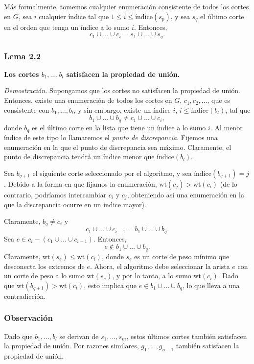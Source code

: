 \documentclass[a4paper, 12pt]{article}
\begin{document}
Más formalmente, tomemos cualquier enumeración consistente de todos los cortes en \( G \), sea \( i \) cualquier índice tal que \( 1 \leq i \leq \text{índice}(s_p) \), y sea \( s_q \) el último corte en el orden que tenga un índice a lo sumo \( i \). Entonces,
\[
c_1 \cup \dots \cup c_i = s_1 \cup \dots \cup s_q.
\]

\subsubsection*{Lema 2.2}
\textbf{Los cortes \( b_1, \dots, b_l \) satisfacen la propiedad de unión.}

\textit{Demostración.} Supongamos que los cortes no satisfacen la propiedad de unión. Entonces, existe una enumeración de todos los cortes en \( G \), \( c_1, c_2, \dots \), que es consistente con \( b_1, \dots, b_l \), y sin embargo, existe un índice \( i \), \( i \leq \text{índice}(b_l) \), tal que
\[
b_1 \cup \dots \cup b_q \neq c_1 \cup \dots \cup c_i,
\]
donde \( b_q \) es el último corte en la lista que tiene un índice a lo sumo \( i \). Al menor índice de este tipo lo llamaremos el \emph{punto de discrepancia}. Fijemos una enumeración en la que el punto de discrepancia sea máximo. Claramente, el punto de discrepancia tendrá un índice menor que \( \text{índice}(b_l) \).  

Sea \( b_{q+1} \) el siguiente corte seleccionado por el algoritmo, y sea \( \text{índice}(b_{q+1}) = j \). Debido a la forma en que fijamos la enumeración, \( \text{wt}(c_j) > \text{wt}(c_i) \) (de lo contrario, podríamos intercambiar \( c_i \) y \( c_j \), obteniendo así una enumeración en la que la discrepancia ocurre en un índice mayor).  

Claramente, \( b_q \neq c_i \) y  
\[
c_1 \cup \dots \cup c_{i-1} = b_1 \cup \dots \cup b_q.
\]
Sea \( e \in c_i - (c_1 \cup \dots \cup c_{i-1}) \). Entonces,  
\[
e \notin b_1 \cup \dots \cup b_q.
\]
Claramente, \( \text{wt}(s_e) \leq \text{wt}(c_i) \), donde \( s_e \) es un corte de peso mínimo que desconecta los extremos de \( e \). Ahora, el algoritmo debe seleccionar la arista \( e \) con un corte de peso a lo sumo \( \text{wt}(s_e) \), y por lo tanto, a lo sumo \( \text{wt}(c_i) \). Dado que \( \text{wt}(b_{q+1}) > \text{wt}(c_i) \), esto implica que \( e \in b_1 \cup \dots \cup b_q \), lo que lleva a una contradicción.

\subsubsection*{Observación}
Dado que \( b_1, \dots, b_l \) se derivan de \( s_1, \dots, s_m \), estos últimos cortes también satisfacen la propiedad de unión. Por razones similares, \( g_1, \dots, g_{n-1} \) también satisfacen la propiedad de unión.
\end{document}
